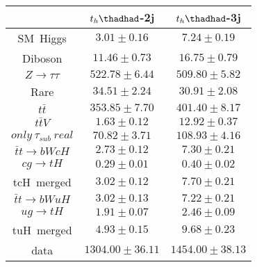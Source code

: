 \centering
\begin{tabular}{ccc} \toprule\toprule
 & $t_{h}\thadhad$-2j & $t_{h}\thadhad$-3j\\\midrule
 SM~Higgs & $3.01\pm0.16$ & $7.24\pm0.19$\\
 Diboson & $11.46\pm0.73$ & $16.75\pm0.79$\\
 $Z\to\tau\tau$ & $522.78\pm6.44$ & $509.80\pm5.82$\\
 Rare & $34.51\pm2.24$ & $30.91\pm2.08$\\
 $t\bar{t}$ & $353.85\pm7.70$ & $401.40\pm8.17$\\
 $t\bar{t}V$ & $1.63\pm0.12$ & $12.92\pm0.37$\\
 $only~\tau_{sub}~real$ & $70.82\pm3.71$ & $108.93\pm4.16$\\\midrule\midrule
$\bar{t}t\to bWcH$ & $2.73\pm0.12$ & $7.30\pm0.21$\\
$cg\to tH$ & $0.29\pm0.01$ & $0.40\pm0.02$\\
tcH~merged & $3.02\pm0.12$ & $7.70\pm0.21$\\\midrule
$\bar{t}t\to bWuH$ & $3.02\pm0.13$ & $7.22\pm0.21$\\
$ug\to tH$ & $1.91\pm0.07$ & $2.46\pm0.09$\\
tuH~merged & $4.93\pm0.15$ & $9.68\pm0.23$\\\midrule\midrule
data & $1304.00\pm36.11$ & $1454.00\pm38.13$\\
\bottomrule\bottomrule
\end{tabular}